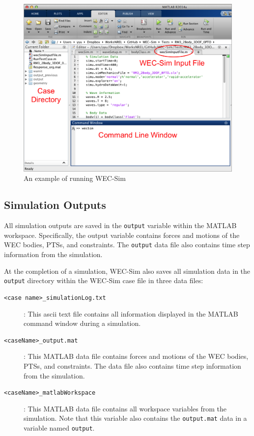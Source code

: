 \begin{figure}[H]
\noindent \centering{}\includegraphics[scale=0.55]{gettingStarted/Figures/runWECSim_mod}\protect\caption{An example of running WEC-Sim}
\label{fig:exampleRunWECSim}
\end{figure}

\subsection{Simulation Outputs}\label{sec:simulationOutputs}
All simulation outputs are saved in the \texttt{output} variable within the MATLAB workspace. Specifically, the output variable contains forces and motions of the WEC bodies, PTSs, and constraints. The \texttt{output} data file also contains time step information from the simulation.

At the completion of a simulation, WEC-Sim also saves all simulation data in the \texttt{output} directory within the WEC-Sim case file in three data files:
\begin{description}
\item[\texttt{<case name>\_simulationLog.txt}]: This ascii text file contains all information displayed in the MATLAB command window during a simulation.
\item[\texttt{<caseName>\_output.mat}]: This MATLAB data file contains forces and motions of the WEC bodies, PTSs, and constraints. The data file also contains time step information from the simulation.
\item[\texttt{<caseName>\_matlabWorkspace}]: This MATLAB data file contains all workspace variables from the simulation. Note that this variable also contains the \texttt{output.mat} data in a variable named \texttt{output}.
\end{description}

